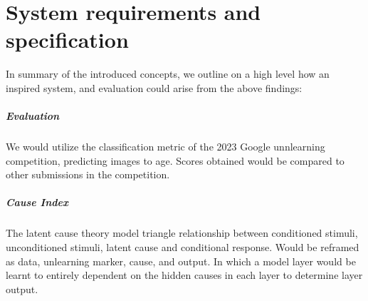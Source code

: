 \documentclass{surreydissertation}
\begin{document}




\chapter{System requirements and specification}
In summary of the introduced concepts, we outline on a high level how an inspired system, and evaluation could arise from the above findings:

\paragraph{Evaluation} We would utilize the classification metric of the 2023 Google unnlearning competition, predicting images to age. Scores obtained would be compared to other submissions in the competition.

\paragraph{Cause Index} The latent cause theory model triangle relationship between conditioned stimuli, unconditioned stimuli, latent cause and conditional response. Would be reframed as data, unlearning marker, cause, and output. In which a model layer would be learnt to entirely dependent on the hidden causes in each layer to determine layer output. 
\end{document}
